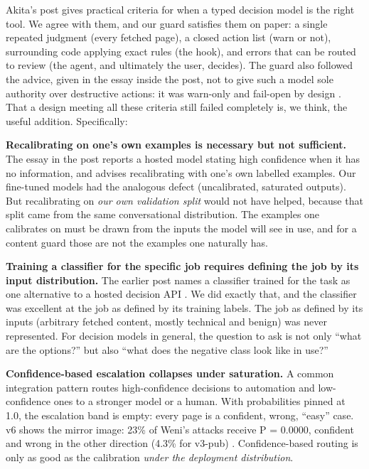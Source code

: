 \documentclass[11pt]{article}
\begin{document}
Akita's post \citep{akita2026jev} gives practical criteria for when a typed decision model is the right tool. We agree with them, and our guard satisfies them on paper: a single repeated judgment (every fetched page), a closed action list (warn or not), surrounding code applying exact rules (the hook), and errors that can be routed to review (the agent, and ultimately the user, decides). The guard also followed the advice, given in the essay inside the post, not to give such a model sole authority over destructive actions: it was warn-only and fail-open by design%
. That a design meeting all these criteria still failed completely is, we think, the useful addition. Specifically:

\textbf{Recalibrating on one's own examples is necessary but not sufficient.} The essay in the post reports a hosted model stating high confidence when it has no information, and advises recalibrating with one's own labelled examples. %
Our fine-tuned models had the analogous defect (uncalibrated, saturated outputs). But recalibrating on \emph{our own validation split} would not have helped, because that split came from the same conversational distribution. The examples one calibrates on must be drawn from the inputs the model will see in use, and for a content guard those are not the examples one naturally has.

\textbf{Training a classifier for the specific job requires defining the job by its input distribution.} The earlier post names a classifier trained for the task as one alternative to a hosted decision API \citep{akita2026typesafe}. We did exactly that, and the classifier was excellent at the job as defined by its training labels. The job as defined by its inputs (arbitrary fetched content, mostly technical and benign) was never represented. For decision models in general, the question to ask is not only ``what are the options?'' but also ``what does the negative class look like in use?''

\textbf{Confidence-based escalation collapses under saturation.} A common integration pattern routes high-confidence decisions to automation and low-confidence ones to a stronger model or a human. With probabilities pinned at 1.0, the escalation band is empty: every page is a confident, wrong, ``easy'' case. v6 shows the mirror image: 23\% of Weni's attacks receive P = 0.0000, confident and wrong in the other direction (4.3\% for v3-pub)%
. Confidence-based routing is only as good as the calibration \emph{under the deployment distribution}.
\end{document}
